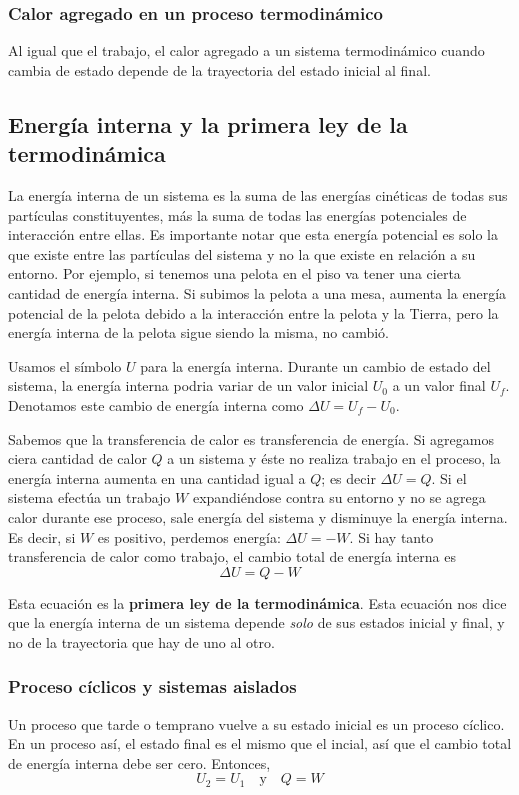 \documentclass[12pt]{article}
\begin{document}
  \subsubsection{Calor agregado en un proceso termodinámico}
  Al igual que el trabajo, el calor agregado a un sistema termodinámico cuando cambia de estado depende de la trayectoria del estado inicial al final.

  \subsection{Energía interna y la primera ley de la termodinámica}
  La energía interna de un sistema es la suma de las energías cinéticas de todas sus partículas constituyentes, más la suma de todas las energías potenciales de interacción entre ellas. Es importante notar que esta energía potencial es solo la que existe entre las partículas del sistema y no la que existe en relación a su entorno. Por ejemplo, si tenemos una pelota en el piso va tener una cierta cantidad de energía interna. Si subimos la pelota a una mesa, aumenta la energía potencial de la pelota debido a la interacción entre la pelota y la Tierra, pero la energía interna de la pelota sigue siendo la misma, no cambió.

  Usamos el símbolo $ U $ para la energía interna. Durante un cambio de estado del sistema, la energía interna podria variar de un valor inicial $ U_{0} $ a un valor final $ U_{f} $. Denotamos este cambio de energía interna como $ \Delta U = U_{f} - U_{0} $.

  Sabemos que la transferencia de calor es transferencia de energía. Si agregamos ciera cantidad de calor $ Q $ a un sistema y éste no realiza trabajo en el proceso, la energía interna aumenta en una cantidad igual a $ Q $; es decir $ \Delta U = Q $. Si el sistema efectúa un trabajo $ W $ expandiéndose contra su entorno y no se agrega calor durante ese proceso, sale energía del sistema y disminuye la energía interna. Es decir, si $ W $ es positivo, perdemos energía: $ \Delta U = -W $. Si hay tanto transferencia de calor como trabajo, el cambio total de energía interna es
  \[
  \Delta U = Q - W
  \]

  Esta ecuación es la \textbf{primera ley de la termodinámica}. Esta ecuación nos dice que la energía interna de un sistema depende \textit{solo} de sus estados inicial y final, y no de la trayectoria que hay de uno al otro.

  \subsubsection{Proceso cíclicos y sistemas aislados}
  Un proceso que tarde o temprano vuelve a su estado inicial es un proceso cíclico. En un proceso así, el estado final es el mismo que el incial, así que el cambio total de energía interna debe ser cero. Entonces, 
  \[
  U_{2} = U_{1} \quad \text{y} \quad Q = W
  \]
\end{document}
